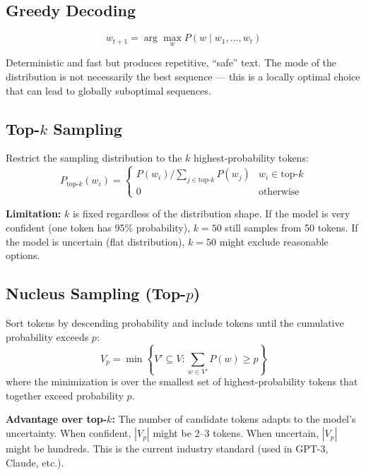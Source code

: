 \documentclass[11pt, a4paper]{article}
\theoremstyle{definition}
\begin{document}
\subsection{Greedy Decoding}

\begin{equation}
    w_{t+1} = \arg\max_w P(w \mid w_1, \ldots, w_t)
\end{equation}

Deterministic and fast but produces repetitive, ``safe'' text. The mode of the distribution is not necessarily the best sequence — this is a locally optimal choice that can lead to globally suboptimal sequences.

\subsection{Top-$k$ Sampling}

Restrict the sampling distribution to the $k$ highest-probability tokens:
\begin{equation}
    P_{\text{top-}k}(w_i) = \begin{cases}
        P(w_i) / \sum_{j \in \text{top-}k} P(w_j) & w_i \in \text{top-}k \\
        0 & \text{otherwise}
    \end{cases}
\end{equation}

\textbf{Limitation:} $k$ is fixed regardless of the distribution shape. If the model is very confident (one token has 95\% probability), $k=50$ still samples from 50 tokens. If the model is uncertain (flat distribution), $k=50$ might exclude reasonable options.

\subsection{Nucleus Sampling (Top-$p$)}

Sort tokens by descending probability and include tokens until the cumulative probability exceeds $p$:
\begin{equation}
    V_p = \min\left\{V' \subseteq V : \sum_{w \in V'} P(w) \geq p\right\}
\end{equation}
where the minimization is over the smallest set of highest-probability tokens that together exceed probability $p$.

\textbf{Advantage over top-$k$:} The number of candidate tokens adapts to the model's uncertainty. When confident, $|V_p|$ might be 2--3 tokens. When uncertain, $|V_p|$ might be hundreds. This is the current industry standard (used in GPT-3, Claude, etc.).
\end{document}

